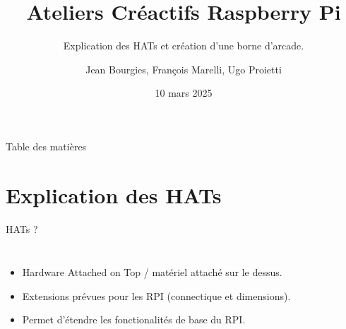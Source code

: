 \documentclass[aspectratio=169,xcolor=dvipsnames]{beamer}
\title{Ateliers Créactifs Raspberry Pi}
\subtitle{Explication des HATs et création d'une borne d'arcade.}
\author{Jean Bourgies, François Marelli, Ugo Proietti}
\date{10 mars 2025}
\begin{document}
\begin{frame}
    \titlepage
\end{frame}

\begin{frame}{Table des matières}
    \tableofcontents
\end{frame}

\section{Explication des HATs}

\begin{frame}{HATs ?}
    \begin{columns}[c] %

        \begin{itemize}
            \item Hardware Attached on Top / matériel attaché sur le dessus.
            \item Extensions prévues pour les RPI (connectique et dimensions).
            \item Permet d'étendre les fonctionalités de base du RPI.
        \end{itemize}

    \end{columns}
\end{frame}
\end{document}
